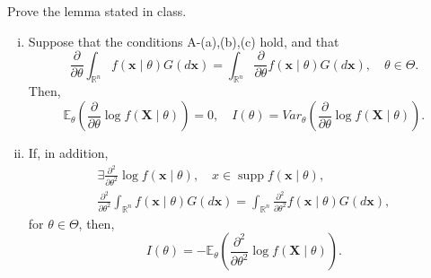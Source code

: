 \begin{ex}
    Prove the lemma stated in class. 
    \begin{enumerate}[(i)]
        \item Suppose that the conditions A-(a),(b),(c) hold, and that
        \[
        \frac{\partial}{\partial \theta} \int_{\mathbb{R}^{n}} f(\boldsymbol{x} \mid \theta) G(d \boldsymbol{x})=\int_{\mathbb{R}^{n}} \frac{\partial}{\partial \theta} f(\boldsymbol{x} \mid \theta) G(d \boldsymbol{x}), \quad \theta \in \Theta .
        \]
        Then,
        \[
        \mathbb{E}_{\theta}\left(\frac{\partial}{\partial \theta} \log f(\boldsymbol{X} \mid \theta)\right)=0, \quad I(\theta)= Var_{\theta}\left(\frac{\partial}{\partial \theta} \log f(\boldsymbol{X} \mid \theta)\right). 
        \]
        \item If, in addition,
        \[
        \begin{gathered}
        \exists \frac{\partial^{2}}{\partial \theta^{2}} \log f(\boldsymbol{x} \mid \theta), \quad x \in \operatorname{supp} f(\boldsymbol{x} \mid \theta), \\
        \frac{\partial^{2}}{\partial \theta^{2}} \int_{\mathbb{R}^{n}} f(\boldsymbol{x} \mid \theta) G(d \boldsymbol{x})=\int_{\mathbb{R}^{n}} \frac{\partial^{2}}{\partial \theta^{2}} f(\boldsymbol{x} \mid \theta) G(d \boldsymbol{x}),
        \end{gathered}
        \]
        for \(\theta \in \Theta\), then,
        \[
        I(\theta)=-\mathbb{E}_{\theta}\left(\frac{\partial^{2}}{\partial \theta^{2}} \log f(\boldsymbol{X} \mid \theta)\right). 
        \]
    \end{enumerate}
\end{ex}

